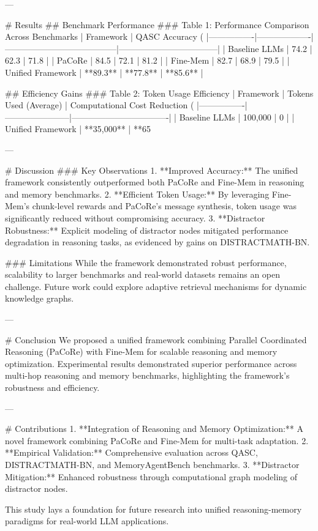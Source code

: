 ---

# Results  
## Benchmark Performance  
### Table 1: Performance Comparison Across Benchmarks  
| Framework      | QASC Accuracy (%
|----------------|-------------------|---------------------------------------|-----------------------------------|  
| Baseline LLMs | 74.2              | 62.3                                  | 71.8                              |  
| PaCoRe        | 84.5              | 72.1                                  | 81.2                              |  
| Fine-Mem      | 82.7              | 68.9                                  | 79.5                              |  
| Unified Framework | **89.3**      | **77.8**                              | **85.6**                          |  

## Efficiency Gains  
### Table 2: Token Usage Efficiency  
| Framework      | Tokens Used (Average) | Computational Cost Reduction (%
|----------------|-----------------------|----------------------------------|  
| Baseline LLMs | 100,000              | 0                                |  
| Unified Framework | **35,000**      | **65%

---

# Discussion  
### Key Observations  
1. **Improved Accuracy:** The unified framework consistently outperformed both PaCoRe and Fine-Mem in reasoning and memory benchmarks.  
2. **Efficient Token Usage:** By leveraging Fine-Mem's chunk-level rewards and PaCoRe's message synthesis, token usage was significantly reduced without compromising accuracy.  
3. **Distractor Robustness:** Explicit modeling of distractor nodes mitigated performance degradation in reasoning tasks, as evidenced by gains on DISTRACTMATH-BN.

### Limitations  
While the framework demonstrated robust performance, scalability to larger benchmarks and real-world datasets remains an open challenge. Future work could explore adaptive retrieval mechanisms for dynamic knowledge graphs.

---

# Conclusion  
We proposed a unified framework combining Parallel Coordinated Reasoning (PaCoRe) with Fine-Mem for scalable reasoning and memory optimization. Experimental results demonstrated superior performance across multi-hop reasoning and memory benchmarks, highlighting the framework's robustness and efficiency.  

---

# Contributions  
1. **Integration of Reasoning and Memory Optimization:** A novel framework combining PaCoRe and Fine-Mem for multi-task adaptation.  
2. **Empirical Validation:** Comprehensive evaluation across QASC, DISTRACTMATH-BN, and MemoryAgentBench benchmarks.  
3. **Distractor Mitigation:** Enhanced robustness through computational graph modeling of distractor nodes.  

This study lays a foundation for future research into unified reasoning-memory paradigms for real-world LLM applications.